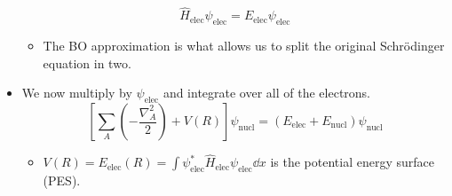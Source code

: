 \documentclass[../notes.tex]{subfiles}
\begin{document}
\begin{itemize}
    \begin{equation*}
        \hat{H}_\text{elec}\psi_\text{elec} = E_\text{elec}\psi_\text{elec}
    \end{equation*}
    \begin{itemize}
        \item The BO approximation is what allows us to split the original Schr\"{o}dinger equation in two.
    \end{itemize}
    \item We now multiply by $\psi_\text{elec}$ and integrate over all of the electrons.
    \begin{equation*}
        \left[ \sum_A\left( -\frac{\nabla_A^2}{2} \right)+V(R) \right]\psi_\text{nucl} = (E_\text{elec}+E_\text{nucl})\psi_\text{nucl}
    \end{equation*}
    \begin{itemize}
        \item $V(R)=E_\text{elec}(R)=\int\psi_\text{elec}^*\hat{H}_\text{elec}\psi_\text{elec}\dd{x}$ is the potential energy surface (PES).
    \end{itemize}
\end{itemize}
\end{document}

